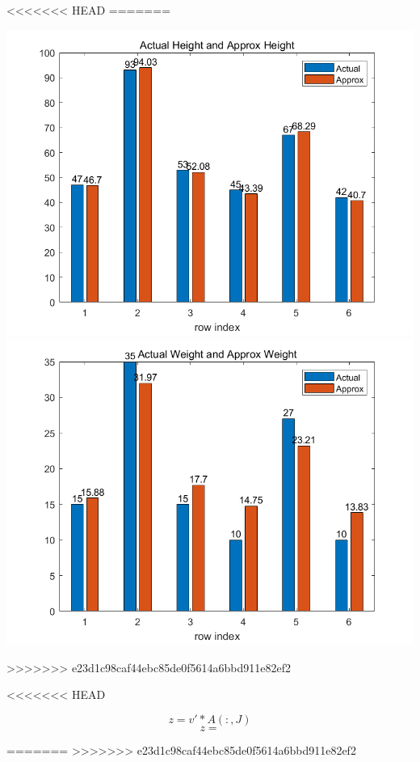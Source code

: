 \documentclass{article}
\begin{document}
<<<<<<< HEAD
=======
\begin{center}
    \includegraphics[scale = 0.6]{height.png}
    \includegraphics[scale = 0.6]{weight.png}
    
\end{center}

   

    
>>>>>>> e23d1c98caf44ebc85de0f5614a6bbd911e82ef2




<<<<<<< HEAD




$$z = v' * A(:,J)$$
$$z = $$

=======
>>>>>>> e23d1c98caf44ebc85de0f5614a6bbd911e82ef2
\end{document}
